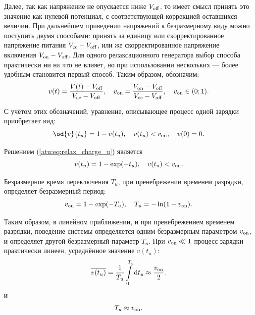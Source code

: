 Далее, так как напряжение не опускается ниже $V_\mathrm{off}$,
то имеет смысл принять это значение как нулевой потенциал, с соответствующей
коррекцией оставшихся величин. При дальнейшем приведении напряжений к безразмерному виду
можно поступить двумя способами: принять за единицу или
скорректированное напряжение питания $V_\mathrm{cc}-V_\mathrm{off}$,
или же
скорректированное напряжение включения $V_\mathrm{on}-V_\mathrm{off}$.
Для одного релаксационного генератора выбор способа практически ни
на что не влияет, но при использовании нескольких --- более удобным
становится первый способ. Таким образом, обозначим:
%
\begin{equation}
  v(t) = \frac{V(t)-V_\mathrm{off}}{V_\mathrm{cc}-V_\mathrm{off}},
  \quad
  v_\mathrm{on} = \frac{V_\mathrm{on}-V_\mathrm{off}}{V_\mathrm{cc}-V_\mathrm{off}},
  \quad
  v_\mathrm{on} \in ( 0; 1 ).
  \label{atu:eq:v_u_relax}
\end{equation}

С учётом этих обозначений, уравнение, описывающее процесс одной зарядки приобретает вид:
%
\begin{equation}
  \od{v}{t_u} = 1 - v( t_u ),
  \quad
  v( t_u ) < v\Tidx{on},
  \quad
  v(0) = 0.
  \label{atu:eq:relax_charge_u}
\end{equation}

Решением (\ref{atu:eq:relax_charge_u}) является
%
\begin{equation}
  v(t_u) = 1 - \exp( - t_u ) ,
  \quad
  v( t_u ) < v_\mathrm{on}.
  \label{atu:eq:relax_charge_u_solu}
\end{equation}

Безразмерное время переключения $T_u$,
при пренебрежении временем разрядки,
определяет безразмерный период:
%
\begin{equation}
  v_\mathrm{on} = 1 - \exp( - T_u ),
  \quad
  T_u = - \ln ( 1 - v_\mathrm{on} ).
  \label{atu:eq:T_u_relax}
\end{equation}

Таким образом, в линейном приближении, и при пренебрежением временем разрядки,
поведение системы определяется одним безразмерным параметром $v_\mathrm{on}$,
и определяет другой безразмерный параметр $T_u$.
При $v_\mathrm{on} \ll 1 $ процесс зарядки практически линеен,
усреднённое значение $v(t_u)$:
%
\begin{equation}
  \overline{v(t_u)} =
  \frac{1}{T_u}\int\limits_{0}^{T_u} \mathrm{d}t_u
  \approx
  \frac{v_\mathrm{on}}{ 2 }.
  \label{atu:eq:av_lin_relax}
\end{equation}
%
и
%
\begin{equation}
  T_u
  \approx
  v_\mathrm{on}.
  \label{atu:eq:T_u_lin_relax}
\end{equation}

